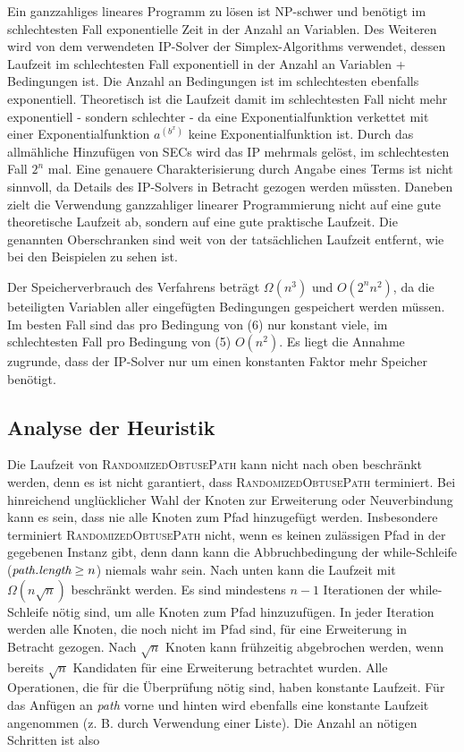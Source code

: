 \documentclass[a4paper, 10pt, ngerman]{article}
\begin{document}
Ein ganzzahliges lineares Programm zu lösen ist NP-schwer und benötigt im schlechtesten Fall exponentielle Zeit in der Anzahl an Variablen. Des Weiteren wird von dem verwendeten IP-Solver der Simplex-Algorithms verwendet, dessen Laufzeit im schlechtesten Fall exponentiell in der Anzahl an Variablen + Bedingungen ist. Die Anzahl an Bedingungen ist im schlechtesten ebenfalls exponentiell. Theoretisch ist die Laufzeit damit im schlechtesten Fall nicht mehr exponentiell - sondern schlechter - da eine Exponentialfunktion verkettet mit einer Exponentialfunktion $a^{(b^x)}$ keine Exponentialfunktion ist. Durch das allmähliche Hinzufügen von SECs wird das IP mehrmals gelöst, im schlechtesten Fall $2^n$ mal. Eine genauere Charakterisierung durch Angabe eines Terms ist nicht sinnvoll, da Details des IP-Solvers in Betracht gezogen werden müssten. Daneben zielt die Verwendung ganzzahliger linearer Programmierung nicht auf eine gute theoretische Laufzeit ab, sondern auf eine gute praktische Laufzeit. Die genannten Oberschranken sind weit von der tatsächlichen Laufzeit entfernt, wie bei den Beispielen zu sehen ist. 

Der Speicherverbrauch des Verfahrens beträgt $\Omega(n^3)$ und $O(2^n n^2)$, da die beteiligten Variablen aller eingefügten Bedingungen gespeichert werden müssen. Im besten Fall sind das pro Bedingung von (6) nur konstant viele, im schlechtesten Fall pro Bedingung von (5) $O(n^2)$. Es liegt die Annahme zugrunde, dass der IP-Solver nur um einen konstanten Faktor mehr Speicher benötigt.

\subsection{Analyse der Heuristik}

Die Laufzeit von \textsc{RandomizedObtusePath} kann nicht nach oben beschränkt werden, denn es ist nicht garantiert, dass \textsc{RandomizedObtusePath} terminiert. Bei hinreichend unglücklicher Wahl der Knoten zur Erweiterung oder Neuverbindung kann es sein, dass nie alle Knoten zum Pfad hinzugefügt werden. Insbesondere terminiert \textsc{RandomizedObtusePath} nicht, wenn es keinen zulässigen Pfad in der gegebenen Instanz gibt, denn dann kann die Abbruchbedingung der while-Schleife ($\emph{path.length} \ge n$) niemals wahr sein. Nach unten kann die Laufzeit mit $\Omega(n \sqrt n)$ beschränkt werden. Es sind mindestens $n - 1$ Iterationen der while-Schleife nötig sind, um alle Knoten zum Pfad hinzuzufügen. In jeder Iteration werden alle Knoten, die noch nicht im Pfad sind, für eine Erweiterung in Betracht gezogen. Nach $\sqrt n$ Knoten kann frühzeitig abgebrochen werden, wenn bereits $\sqrt n$ Kandidaten für eine Erweiterung betrachtet wurden. Alle Operationen, die für die Überprüfung nötig sind, haben konstante Laufzeit. Für das Anfügen an \emph{path} vorne und hinten wird ebenfalls eine konstante Laufzeit angenommen (z. B. durch Verwendung einer Liste). Die Anzahl an nötigen Schritten ist also
\end{document}
